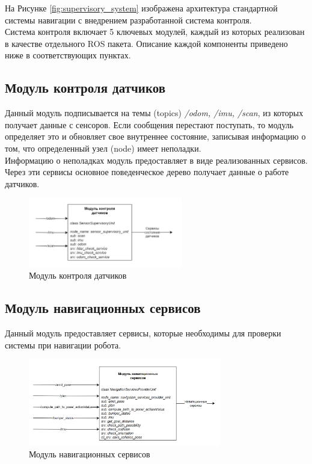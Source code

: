 На Рисунке \ref*{fig:supervisory_system} изображена архитектура стандартной системы навигации с внедрением разработанной система контроля. \\
Система контроля включает 5 ключевых модулей, каждый из которых реализован в качестве отдельного ROS пакета. Описание каждой компоненты приведено ниже в соответствующих пунктах.

\subsection{Модуль контроля датчиков}

Данный модуль подписывается на темы (topics) \textit{/odom, /imu, /scan}, из которых получает данные с сенсоров. Если сообщения перестают поступать, то модуль определяет это и обновляет свое внутреннее состояние, записывая информацию о том, что определенный узел (node) имеет неполадки. \\ 
Информацию о неполадках модуль предоставляет в виде реализованных сервисов. Через эти сервисы основное поведенческое дерево получает данные о работе датчиков.

\begin{figure}[h]
    \centering
    \includegraphics[width=0.6\textwidth]{images/chap_3/sensor_supervisory_unit.png}
    \caption{Модуль контроля датчиков}
    \label{fig:sensor_supervisory_unit}
\end{figure}

\subsection{Модуль навигационных сервисов}

Данный модуль предоставляет сервисы, которые необходимы для проверки системы при навигации робота. 

\begin{figure}[h]
    \centering
    \includegraphics[width=0.75\textwidth]{images/chap_3/navigation_services_unit.png}
    \caption{Модуль навигационных сервисов}
    \label{fig:navigation_services_unit}
\end{figure}

